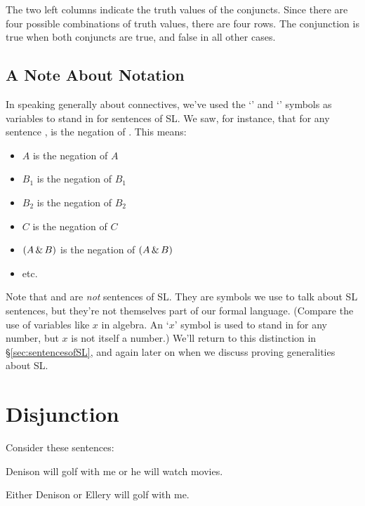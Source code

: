 The two left columns indicate the truth values of the conjuncts. Since there are four possible combinations of truth values, there are four rows. The conjunction is true when both conjuncts are true, and false in all other cases.


\subsection{A Note About Notation}
\label{notationnote}

In speaking generally about connectives, we've used the `\metaA{}' and `\metaB{}' symbols as variables to stand in for sentences of SL. We saw, for instance, that for any sentence \metaA{}, \enot\metaA{} is the negation of \metaA{}. This means:

\begin{itemize}
\item \enot $A$ is the negation of $A$
\item \enot $B_1$ is the negation of $B_1$
\item \enot $B_2$ is the negation of $B_2$
\item \enot \enot $C$ is the negation of \enot $C$
\item \enot $(A \,\&\, B)$ is the negation of $(A\,\&\, B)$
\item etc.
\end{itemize}

Note that \metaA{} and \metaB{} are \emph{not} sentences of SL. They are symbols we use to talk about SL sentences, but they're not themselves part of our formal language. (Compare the use of variables like $x$ in algebra. An `$x$' symbol is used to stand in for any number, but $x$ is not itself a number.) We'll return to this distinction in \S\ref{sec:sentencesofSL}, and again later on when we discuss proving generalities about SL.


\section{Disjunction}
Consider these sentences:
\begin{earg}
\item[\ex{or1}]Denison will golf with me or he will watch movies.
\item[\ex{or2}]Either Denison or Ellery will golf with me. 
\end{earg}

